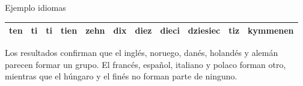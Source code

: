\documentclass[spanish]{beamer}
\begin{document}
\begin{frame}{Ejemplo idiomas}
\begin{table}[h]
{\begin{tabular}{lllllllllll}
ten                                                  & ti                                                    & ti                                                   & tien                                                    & zehn                                                 & dix                                                    & diez                                                   & dieci                                                  & dziesiec                                             & tiz                                                   & kymmenen                                             \\ \bottomrule
\end{tabular}
}
\end{table}
\end{frame}

\begin{frame}{}
Los resultados confirman que el inglés, noruego, danés, holandés y alemán parecen formar un grupo. El francés, español, italiano y polaco forman otro, mientras que el húngaro y el finés no forman parte de ninguno.
\begin{table}[h]
\centering
{}
\end{table}
\end{frame}
\end{document}
